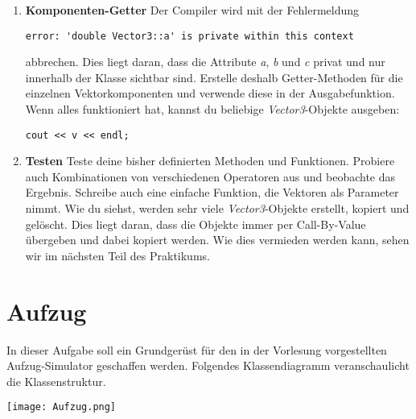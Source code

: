 \begin{enumerate}
\item\textbf{Komponenten-Getter}
Der Compiler wird mit der Fehlermeldung 
\begin{verbatim}
error: 'double Vector3::a' is private within this context
\end{verbatim}
abbrechen.
Dies liegt daran, dass die Attribute \emph{a}, \emph{b} und \emph{c} privat und nur innerhalb der Klasse sichtbar sind.
Erstelle deshalb Getter-Methoden für die einzelnen Vektorkomponenten und verwende diese in der Ausgabefunktion.
Wenn alles funktioniert hat, kannst du beliebige \emph{Vector3}-Objekte ausgeben:
\begin{lstlisting}
cout << v << endl;
\end{lstlisting} 

\item\textbf{Testen}
Teste deine bisher definierten Methoden und Funktionen.
Probiere auch Kombinationen von verschiedenen Operatoren aus und beobachte das Ergebnis.
Schreibe auch eine einfache Funktion, die Vektoren als Parameter nimmt. 
Wie du siehst, werden sehr viele \emph{Vector3}-Objekte erstellt, kopiert und gelöscht.
Dies liegt daran, dass die Objekte immer per Call-By-Value übergeben und dabei kopiert werden.
Wie dies vermieden werden kann, sehen wir im nächsten Teil des Praktikums.

\end{enumerate}


\section{Aufzug}
In dieser Aufgabe soll ein Grundgerüst für den in der Vorlesung vorgestellten Aufzug-Simulator geschaffen werden.
Folgendes Klassendiagramm veranschaulicht die Klassenstruktur.

\texttt{[image: Aufzug.png]}

